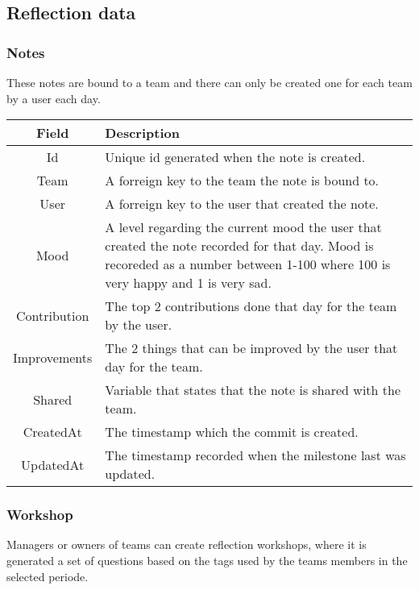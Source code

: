 \subsection{Reflection data}
\subsubsection*{Notes}
These notes are bound to a team and there can only be created one for each team by a user each day. \\

\vspace{0.5cm}
\begin{tabularx}{\linewidth}{| c | X |}
    \hline
    \rowcolor[gray]{0.8}
    \textbf{Field} & \textbf{Description} \\
    \hline
    Id & Unique id generated when the note is created.\\ \hline
    Team & A forreign key to the team the note is bound to.\\ \hline
   	User & A forreign key to the user that created the note.\\ \hline
   	Mood & A level regarding the current mood the user that created the note recorded for that day. Mood is recoreded as a number between 1-100 where 100 is very happy and 1 is very sad.\\ \hline
   	Contribution & The top 2 contributions done that day for the team by the user.\\ \hline
   	Improvements & The 2 things that can be improved by the user that day for the team.\\ \hline
   	Shared & Variable that states that the note is shared with the team.\\ \hline
    CreatedAt & The timestamp which the commit is created.\\ \hline
    UpdatedAt & The timestamp recorded when the milestone last was updated.\\ 
    \hline
\end{tabularx}
\vspace{0.5cm}

\subsubsection*{Workshop}
Managers or owners of teams can create reflection workshops, where it is generated a set of questions based on the tags used by the teams members in the selected periode. \\

